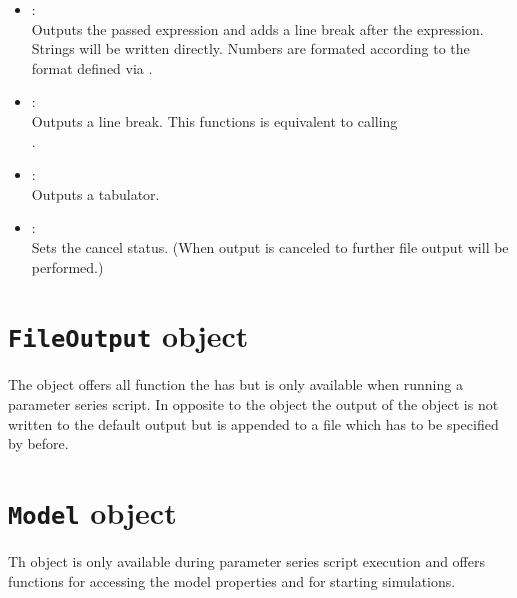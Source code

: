 \begin{itemize}
\item
{}:\\
Outputs the passed expression and adds a line break after the expression.
Strings will be written directly. Numbers are formated according to the format
defined via .

\item
{}:\\
Outputs a line break. This functions is equivalent to calling\\
.

\item
{}:\\
Outputs a tabulator.

\item
{}:\\
Sets the cancel status. (When output is canceled to further file output will be performed.)

\end{itemize}



\chapter{\texttt{FileOutput} object}

The  object offers all function the  has
but is only available when running a parameter series script. In opposite
to the  object the output of the  object
is not written to the default output but is appended to a file which has
to be specified by  before.



\chapter{\texttt{Model} object}

Th  object is only available during parameter series
script execution and offers functions for accessing the model
properties and for starting simulations.

